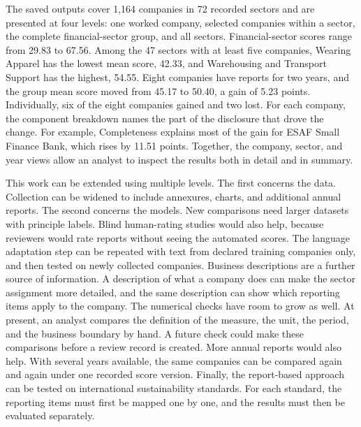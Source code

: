 The saved outputs cover 1,164 companies in 72 recorded sectors and are presented at four levels: one worked company, selected companies within a sector, the complete financial-sector group, and all sectors. Financial-sector scores range from 29.83 to 67.56. Among the 47 sectors with at least five companies, Wearing Apparel has the lowest mean score, 42.33, and Warehousing and Transport Support has the highest, 54.55. Eight companies have reports for two years, and the group mean score moved from 45.17 to 50.40, a gain of 5.23 points. Individually, six of the eight companies gained and two lost. For each company, the component breakdown names the part of the disclosure that drove the change. For example, Completeness explains most of the gain for ESAF Small Finance Bank, which rises by 11.51 points. Together, the company, sector, and year views allow an analyst to inspect the results both in detail and in summary.

This work can be extended using multiple levels. The first concerns the data. Collection can be widened to include annexures, charts, and additional annual reports. The second concerns the models. New comparisons need larger datasets with principle labels. Blind human-rating studies would also help, because reviewers would rate reports without seeing the automated scores. The language adaptation step can be repeated with text from declared training companies only, and then tested on newly collected companies. Business descriptions are a further source of information. A description of what a company does can make the sector assignment more detailed, and the same description can show which reporting items apply to the company. The numerical checks have room to grow as well. At present, an analyst compares the definition of the measure, the unit, the period, and the business boundary by hand. A future check could make these comparisons before a review record is created. More annual reports would also help. With several years available, the same companies can be compared again and again under one recorded score version. Finally, the report-based approach can be tested on international sustainability standards. For each standard, the reporting items must first be mapped one by one, and the results must then be evaluated separately.
